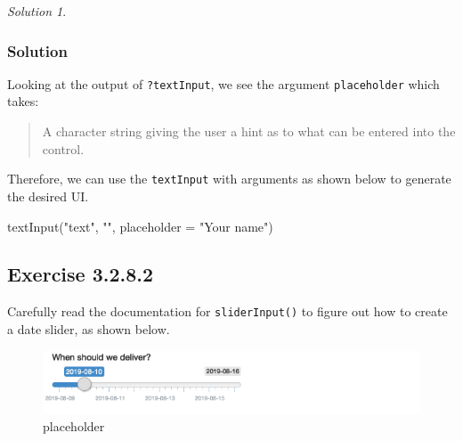 \documentclass[
]{book}
\newenvironment{Shaded}{\begin{snugshade}}{\end{snugshade}}
\newcommand{\AttributeTok}[1]{\textcolor[rgb]{0.77,0.63,0.00}{#1}}
\newcommand{\FunctionTok}[1]{\textcolor[rgb]{0.00,0.00,0.00}{#1}}
\newcommand{\NormalTok}[1]{#1}
\newcommand{\StringTok}[1]{\textcolor[rgb]{0.31,0.60,0.02}{#1}}
\theoremstyle{definition}
\theoremstyle{definition}
\theoremstyle{definition}
\theoremstyle{definition}
\theoremstyle{remark}
\newtheorem*{solution}{Solution}
\begin{document}
\begin{solution}
\leavevmode

\hypertarget{solution-5}{%
\subsubsection*{Solution}\label{solution-5}}

Looking at the output of \texttt{?textInput}, we see the argument \texttt{placeholder} which
takes:

\begin{quote}
A character string giving the user a hint as to what can be entered into
the control.
\end{quote}

Therefore, we can use the \texttt{textInput} with arguments as shown below to generate
the desired UI.

\begin{Shaded}
\begin{Highlighting}[]
\FunctionTok{textInput}\NormalTok{(}\StringTok{"text"}\NormalTok{, }\StringTok{""}\NormalTok{, }\AttributeTok{placeholder =} \StringTok{"Your name"}\NormalTok{)}
\end{Highlighting}
\end{Shaded}

\end{solution}

\hypertarget{exercise-3.2.8.2}{%
\subsection*{Exercise 3.2.8.2}\label{exercise-3.2.8.2}}

Carefully read the documentation for \texttt{sliderInput()} to figure out how to
create a date slider, as shown below.

\begin{figure}
\centering
\includegraphics{images/date-slider.png}
\caption{placeholder}
\end{figure}
\end{document}
